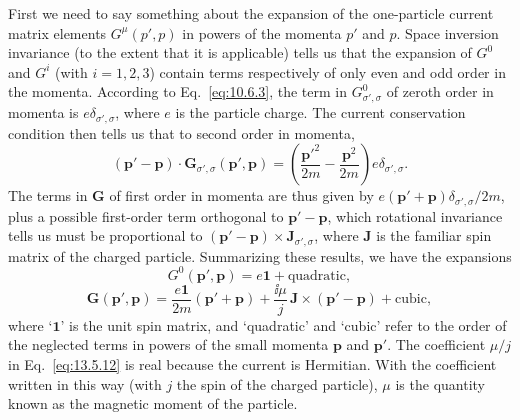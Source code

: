 First we need to say something about the expansion of the one-particle
current matrix elements $G^\mu(p',p)$ in powers of the momenta $p'$ and $p$.
Space inversion invariance (to the extent that it is applicable) tells us that
the expansion of $G^0$ and $G^i$ (with $i=1,2,3$) contain terms respectively of
only even and odd order in the momenta. According to Eq.~\eqref{eq:10.6.3}, the
term in $G^0_{\sigma',\sigma}$ of zeroth order in momenta is $e\delta_{\sigma',\sigma}$, where $e$ is the particle
charge. The current conservation condition then tells us that to second
order in momenta,
\begin{equation*}
(\mathbf p'-\mathbf p)\cdot\mathbf G_{\sigma',\sigma}(\mathbf p',\mathbf p)
=\left(\frac{\mathbf p'^2}{2m}-\frac{\mathbf p^2}{2m}\right)e\delta_{\sigma',\sigma}.
\end{equation*}
The terms in $\mathbf G$ of first order in momenta are thus given by
$e(\mathbf p'+\mathbf p)\delta_{\sigma',\sigma}/2m$, plus a possible first-order term orthogonal to
$\mathbf p'-\mathbf p$, which rotational invariance tells us must be proportional to
$(\mathbf p'-\mathbf p)\times\mathbf J_{\sigma',\sigma}$, where $\mathbf J$ is the familiar spin matrix of the charged particle. Summarizing these results,
we have the expansions
\begin{equation}
G^0(\mathbf p',\mathbf p)=e\mathbf{1}+\text{quadratic},
\tag{13.5.11}\label{eq:13.5.11}
\end{equation}
\begin{equation}
\mathbf G(\mathbf p',\mathbf p)
=\frac{e\mathbf{1}}{2m}(\mathbf p'+\mathbf p)
+\frac{\ii\mu}{j}\,\mathbf J\times(\mathbf p'-\mathbf p)+\text{cubic},
\tag{13.5.12}\label{eq:13.5.12}
\end{equation}
where `$\mathbf{1}$' is the unit spin matrix, and `quadratic' and `cubic' refer to the
order of the neglected terms in powers of the small momenta $\mathbf p$ and $\mathbf p'$. The
coefficient $\mu/j$ in Eq.~\eqref{eq:13.5.12} is real because the current is Hermitian.
With the coefficient written in this way (with $j$ the spin of the charged
particle), $\mu$ is the quantity known as the magnetic moment of the particle.

